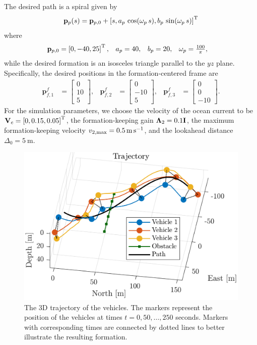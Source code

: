 The desired path is a spiral given by 
\begin{equation}
    \mathbf{p}_p(s) = \mathbf{p}_{p, 0} + \left[s, a_p\,\cos(\omega_p\,s), b_p\,\sin(\omega_p\,s)\right]^{\mathrm{T}}
\end{equation}
where 
\begin{align*}
    \mat{p}_{p, 0} &= \inlinevector{0, -40, 25}, &
    a_p &= 40, &
    b_p &= 20, &
    \omega_p &= \scale[1]{\frac{100}{\pi}},
\end{align*}
while the desired formation is an isosceles triangle parallel to the $yz$ plane.
Specifically, the desired positions in the formation-centered frame are 
\begin{align}
    \mathbf{p}_{f,1}^f &= \begin{bmatrix} 0 \\ 10 \\ 5\end{bmatrix}, &
    \mathbf{p}_{f,2}^f &= \begin{bmatrix} 0 \\ -10 \\ 5\end{bmatrix}, &
    \mathbf{p}_{f,3}^f &= \begin{bmatrix} 0 \\ 0 \\ -10\end{bmatrix}.
\end{align}
For the simulation parameters, we choose the velocity of the ocean current to be $\mathbf{V}_c = \left[0, 0.15, 0.05\right]^{\mathrm{T}}$, the formation-keeping gain $\bm{\Lambda}_2 = 0.1\mathbf{I}$, the maximum formation-keeping velocity $v_{2, \max} = \SI{0.5}{\meter\per\second}$, and the lookahead distance $\Delta_0 = \SI{5}{\meter}$.

\begin{figure}[t]
    \centering
    \includegraphics[width=.75\textwidth]{figures/nsb_R/trajectory.png}
    \vspace{-4mm}
    \caption{The 3D trajectory of the vehicles. The markers represent the position of the vehicles at times $t = 0, 50, \ldots, 250$ seconds. Markers with corresponding times are connected by dotted lines to better illustrate the resulting formation.}
    \label{fig:NSB_R_trajectory}
\end{figure}


